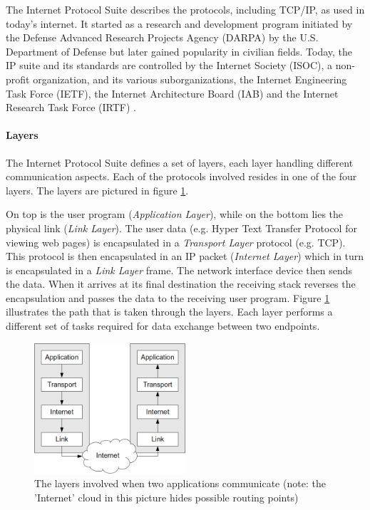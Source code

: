 \documentclass[11pt,twoside,abstract,notitlepage]{scrreprt}
\begin{document}
The Internet Protocol Suite describes the protocols, including TCP/IP, as used in today's internet. It started as a research and development program initiated by the Defense Advanced Research Projects Agency (DARPA) by the U.S. Department of Defense but later gained popularity in civilian fields. Today, the IP suite and its standards are controlled by the Internet Society (ISOC), a non-profit organization, and its various suborganizations, the Internet Engineering Task Force (IETF), the Internet Architecture Board (IAB) and the Internet Research Task Force (IRTF) \cite{isoc}. 



\paragraph{Layers} The Internet Protocol Suite defines a set of layers, each layer handling different communication aspects. Each of the protocols involved resides in one of the four layers. The layers are pictured in figure \ref{fig:iplayers}. 


On top is the user program (\emph{Application Layer}), while on the bottom lies the physical link (\emph{Link Layer}). The user data (e.g. Hyper Text Transfer Protocol for viewing web pages) is encapsulated in a \emph{Transport Layer} protocol (e.g. TCP). This protocol is then encapsulated in an IP packet (\emph{Internet Layer}) which in turn is encapsulated in a \emph{Link Layer} frame. The network interface device then sends the data. When it arrives at its final destination the receiving stack reverses the encapsulation and passes the data to the receiving user program.  Figure \ref{fig:iplayers} illustrates the path that is taken through the layers. Each layer performs a different set of tasks required for data exchange between two endpoints.

\begin{figure}

\centerline{\includegraphics[width=0.5\textwidth]{images/iplayers.png}}
\caption{The layers involved when two applications communicate (note: the 'Internet' cloud in this picture hides possible routing points)}
\label{fig:iplayers}
\end{figure}
\end{document}
